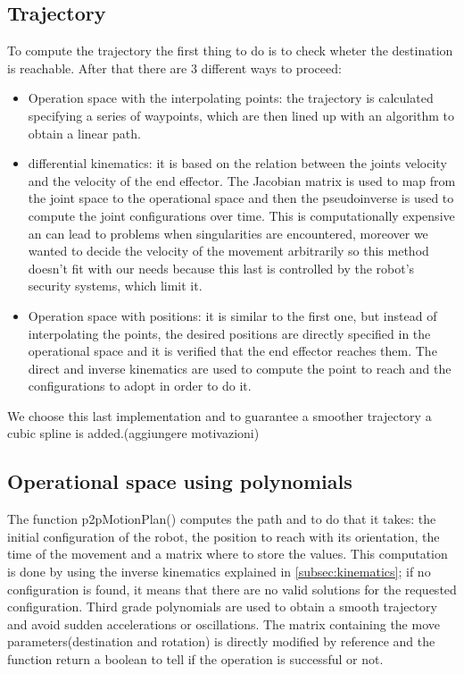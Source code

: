 \documentclass[12pt,a4paper]{article}
\begin{document}
\subsection{Trajectory}\label{subsec:trajectory}
To compute the trajectory the first thing to do is to check wheter the destination is reachable. After that there are 3 different ways to proceed:
\begin{itemize}
    \item Operation space with the interpolating points: the trajectory is calculated specifying a series of waypoints, which are then lined up with an algorithm to obtain a linear path.
    \item differential kinematics: it is based on the relation between the joints velocity and the velocity of the end effector. The Jacobian matrix is used to map from the joint space to the operational space and then the pseudoinverse is used to compute the joint configurations over time. This is computationally expensive an can lead to problems when singularities are encountered, moreover we wanted to decide the velocity of the movement arbitrarily so this method doesn't fit with our needs because this last is controlled by the robot's security systems, which limit it.
    \item Operation space with positions: it is similar to the first one, but instead of interpolating the points, the desired positions are directly specified in the operational space and it is verified that the end effector reaches them. The direct and inverse kinematics are used to compute the point to reach and the configurations to adopt in order to do it. 
\end{itemize}    
We choose this last implementation and to guarantee a smoother trajectory a cubic spline is added.(aggiungere motivazioni)

\subsection{Operational space using polynomials}\label{subsec:opspace}
The function p2pMotionPlan() computes the path and to do that it takes: the initial configuration of the robot, the position to reach with its orientation, the time of the movement and a matrix where to store the values. This computation is done by using the inverse kinematics explained in \ref{subsec:kinematics}; if no configuration is found, it means that there are no valid solutions for the requested configuration. Third grade polynomials are used to obtain a smooth trajectory and avoid sudden accelerations or oscillations. The matrix containing the move parameters(destination and rotation) is directly modified by reference and the function return a boolean to tell if the operation is successful or not.
\end{document}
